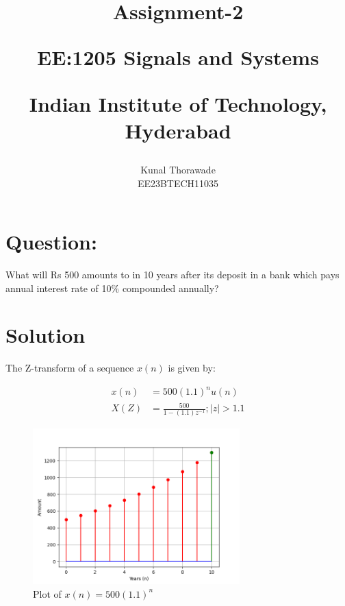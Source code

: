 \documentclass[journal,12pt,twocolumn]{IEEEtran}
\theoremstyle{remark}
\begin{document}
%




\vspace{3cm}

\title{
	Assignment-2

	\large{EE:1205 Signals and Systems}

	Indian Institute of Technology, Hyderabad
}
\author{Kunal Thorawade

EE23BTECH11035
}	

\maketitle


\newpage


\bigskip
 
 \renewcommand{\thefigure}{\theenumi}
 \renewcommand{\thetable}{\arabic{table}}

 \section{Question:}
 What will Rs 500 amounts to in 10 years after its deposit in a bank which pays annual interest rate of 10$\%$ compounded annually?

 \section{Solution}
\fi
 

 The Z-transform of a sequence $x(n)$ is given by:

 \begin{align}
	     x(n) &= 500(1.1)^{n}u(n)
	       \\  X(Z) &= \frac{500}{1 - (1.1)z^{-1}} ; |z| > 1.1
 \end{align}

 \begin{figure}
	     \centering
	         \includegraphics[width = 8cm]{ncert-maths/11/9/3/31/figs/Fig1.png}
		     \caption{Plot of $x(n) = 500(1.1)^n$}
		         \label{fig:enter-label}
 \end{figure}
\end{document}
